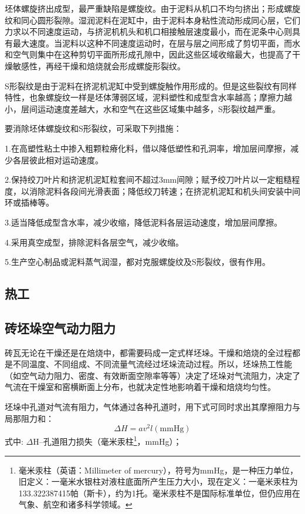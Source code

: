 \documentclass{ctexbook}
\begin{document}
坯体螺旋挤出成型，最严重缺陷是螺旋纹。由于泥料从机口不均匀挤出；形成螺旋纹和同心圆形裂隙。湿润泥料在泥缸中，由于泥料本身粘性流动形成同心层，它们力求以不同速度运动，与挤泥机机头和机口相接触层速度最小，而在泥条中心则具有最大速度。当泥料以这种不同速度运动时，在层与层之间形成了剪切平面，而水和空气则集中在这种剪切平面所形成孔隙中，因此这些区域收缩最大，也提高了干燥敏感性，再经干燥和焙烧就会形成螺旋形裂纹。

S形裂纹是由于泥料在挤泥机泥缸中受到螺旋触作用形成的。但是这些裂纹有同样特性，也象螺旋纹一样是坯体薄弱区域，泥料塑性和成型含水率越高；摩擦力越小，层间运动速度差越大，水和空气在这些区域集中越多，S形裂纹越严重。

要消除坯体螺旋纹和S形裂纹，可采取下列措施：

1.在高塑性粘土中掺入粗颗粒瘠化料，借以降低塑性和孔洞率，增加层间摩擦，减少各层彼此相对运动速度。

2.保持绞刀叶片和挤泥机泥缸粒套间不超过3mm间隙；赋予绞刀叶片以一定粗糙程度，以消除泥料各段间光滑表面；降低绞刀转速；在挤泥机泥缸和机头间安装中间环或插棒等。

3.适当降低成型含水率，减少收缩，降低泥料各层运动速度，增加层间摩擦。

4.采用真空成型，排除泥料各层空气，减少收缩。

5.生产空心制品或泥料蒸气润湿，都对克服螺旋纹及S形裂纹，很有作用。
\subsection{热工}
\subsection{砖坯垛空气动力阻力}
砖瓦无论在干燥还是在焙烧中，都需要码成一定式样坯垛。干燥和焙烧的全过程都是不同温度、不同组成、不同流量气流经过坯垛流动过程。所以，坯垛热工性能（如空气动力阻力、密度、有效断面空隙率等等）决定了坯垛对气流阻力，决定了气流在干燥室和窑横断面上分布，也就决定性地影响着干燥和焙烧均匀性。

坯垛中孔道对气流有阻力，气体通过各种孔道时，用下式可同时求出其摩擦阻力与局那阻力和：
\begin{equation*}
	\Delta H =av^2l (\text{mmHg})
\end{equation*}
式中:
$\Delta$H--孔道阻力损失（毫米汞柱\footnote{毫米汞柱（英语：Millimeter of mercury），符号为mmHg，是一种压力单位，旧定义：一毫米水银柱对液柱底面所产生压力大小，现在定义：一毫米汞柱为133.322387415帕（斯卡），约为1托。毫米汞柱不是国际标准单位，但仍应用在气象、航空和诸多科学领域。}，mmHg）；
\end{document}
